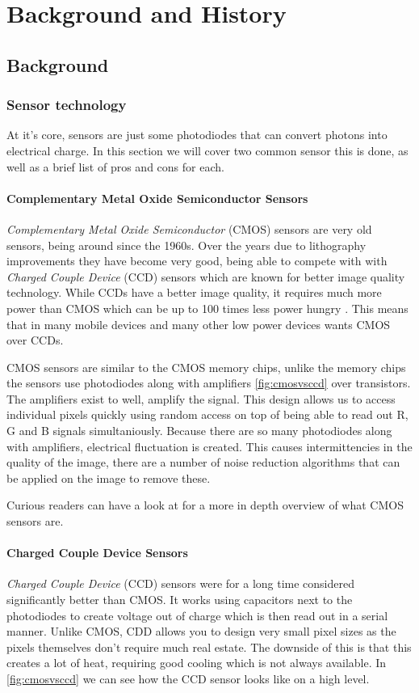 \chapter{Background and History\label{history}}
\section{Background}

\subsection{Sensor technology}
At it's core, sensors are just some photodiodes that can convert photons
into electrical charge. In this section we will cover two common sensor this is
done, as well as a brief list of pros and cons for each.

\subsubsection{Complementary Metal Oxide Semiconductor Sensors}
\textit{Complementary Metal Oxide Semiconductor} (CMOS) sensors are very old
sensors, being around since the 1960s. Over the years due to lithography
improvements they have become very good, being able to compete with with
\textit{Charged Couple Device} (CCD) sensors which are known for better image
quality technology. While CCDs have a better image quality, it requires much
more power than CMOS which can be up to 100 times less power hungry
\cite{CMOSReview}. This means that in many mobile devices and many other low
power devices wants CMOS over CCDs.

CMOS sensors are similar to the CMOS memory chips, unlike the memory chips the
sensors use photodiodes along with amplifiers \cref{fig:cmosvsccd} over
transistors. The amplifiers exist to well, amplify the signal. This design
allows us to access individual pixels quickly using random access on top of being
able to read out R, G and B signals simultaniously\cite{cmosAlen}. Because
there are so many photodiodes along with amplifiers, electrical fluctuation
is created. This causes intermittencies in the quality of the image, there are
a number of noise reduction algorithms that can be applied on the image to
remove these.

Curious readers can have a look at \cite{CMOSReview} \cite{ieeeCMOS} for a more
in depth overview of what CMOS sensors are.

\subsubsection{Charged Couple Device Sensors}
\textit{Charged Couple Device} (CCD) sensors were for a long time considered
significantly better than CMOS. It works using capacitors next to the
photodiodes to create voltage out of charge which is then read out in a serial
manner. Unlike CMOS, CDD allows you to design very small pixel sizes as the
pixels themselves don't require much real estate. The downside of this is that
this creates a lot of heat, requiring good cooling which is not always
available. In \cref{fig:cmosvsccd} we can see how the CCD sensor looks like on
a high level.

